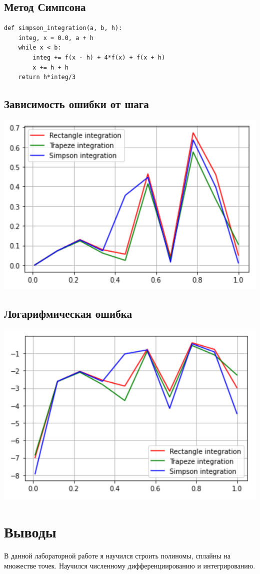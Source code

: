 \documentclass[pdf, unicode, 12pt, a4paper,oneside,fleqn]{article}
\begin{document}
\subsection{Метод Симпсона}

\begin{lstlisting}
def simpson_integration(a, b, h):
    integ, x = 0.0, a + h
    while x < b:
        integ += f(x - h) + 4*f(x) + f(x + h)
        x += h + h
    return h*integ/3
\end{lstlisting}

\subsection{Зависимость ошибки от шага}

\includegraphics[scale=0.5]{data5.png}

\subsection{Логарифмическая ошибка}

\includegraphics[scale=0.5]{data6.png}

\section{Выводы}

В данной лабораторной работе я научился строить полиномы, сплайны на множестве точек. Научился численному дифференциированию и интегрированию.
\end{document}
